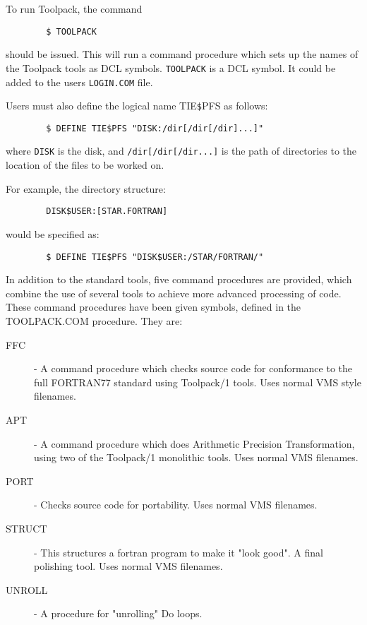 To run Toolpack, the command
\begin{verbatim}
        $ TOOLPACK
\end{verbatim}
should be issued. This will run a command procedure which sets up the names
of the Toolpack tools as DCL symbols. {\tt TOOLPACK} is a DCL symbol. It could 
be added to the users {\tt LOGIN.COM} file.

Users must also define the logical name TIE{\tt{\$}}PFS as follows:
\begin{verbatim}
        $ DEFINE TIE$PFS "DISK:/dir[/dir[/dir]...]"
\end{verbatim}
where {\tt DISK} is the disk, and {\tt /dir[/dir[/dir...]} is the path of 
directories to the location of the files to be worked on. 

For example, the directory
structure:
\begin{verbatim}
        DISK$USER:[STAR.FORTRAN]
\end{verbatim}
would be specified as:
\begin{verbatim}
        $ DEFINE TIE$PFS "DISK$USER:/STAR/FORTRAN/"    
\end{verbatim}
In addition to the standard tools, five command procedures are provided, which
combine the use of several tools to achieve more advanced processing of code.
These command procedures have been given symbols, defined in the TOOLPACK.COM
procedure. They are:
\begin{description}
\item [FFC] -
A command procedure which checks source code for conformance to the full
FORTRAN77 standard using Toolpack/1 tools. Uses normal VMS style filenames.
\item [APT] -
A command procedure which does Arithmetic Precision Transformation, using two
of the Toolpack/1 monolithic tools. Uses normal VMS filenames.
\item [PORT] -
Checks source code for portability. Uses normal VMS filenames.
\item [STRUCT] -
This structures a fortran program to make it "look good". A final polishing
tool. Uses normal VMS filenames.
\item [UNROLL] -
A procedure for "unrolling" Do loops.
\end{description}


